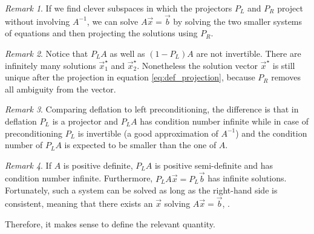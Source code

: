 \documentclass{article}
\theoremstyle{plain} %
\theoremstyle{convention} %
\theoremstyle{remark} %
\newtheorem*{remark}{Remark} %
\numberwithin{equation}{section}
\begin{document}
\begin{remark}
If we find clever subspaces in which the projectors $P_L$ and $P_R$ project without involving $A^{-1}$, we can solve $A\vec{x} = \vec{b}$ by solving the two smaller systems of equations and then projecting the solutions using $P_R$.
\end{remark}

\begin{remark}
Notice that $P_L A$ as well as $(1-P_L)A$ are not invertible. There are infinitely many solutions $\vec{x}^{\star}_1$ and $\vec{x}^{\star}_2$\footnotemark. Nonetheless the solution vector $\vec{x}^{\star}$ is still unique after the projection in equation \eqref{eq:def_projection}, because $P_R$ removes all ambiguity from the vector.
\end{remark}


\begin{remark}
Comparing deflation to left preconditioning, the difference is that in deflation $P_L$ is a projector and $P_L A$ has condition number infinite while in case of preconditioning $P_L $ is invertible (a good approximation of $A^{-1}$) and the condition number of $P_L A$ is expected to be smaller than the one of $A$.
\end{remark}

\begin{remark}
If $A$ is positive definite, $P_L A$ is positive semi-definite and has condition number infinite. Furthermore, $P_L A \vec{x} = P_L \vec{b}$ has infinite solutions. Fortunately, such a system can be solved as long as the right-hand side is consistent, meaning that there exists an $\vec{x}$ solving $A \vec{x} = \vec{b}$, \cite{kaasschieter1988}.
\end{remark}

Therefore, it makes sense to define the relevant quantity.
\end{document}
